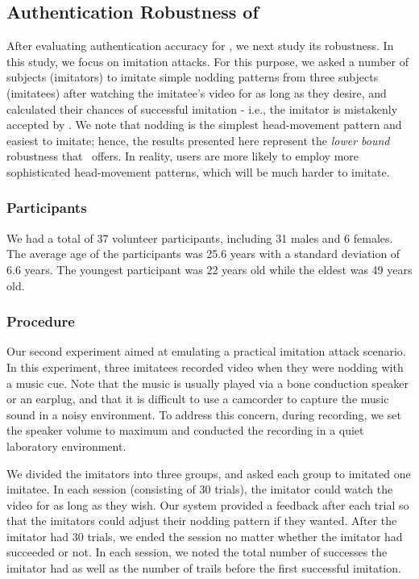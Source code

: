 
\subsection{Authentication Robustness of \systemname} After evaluating authentication accuracy for \systemname, we next study its robustness. In this study, we focus on imitation attacks. For this purpose, we asked a number of subjects (imitators) to imitate simple nodding patterns from three subjects (imitatees) after watching the imitatee's video for as long as they desire, and calculated their chances of successful imitation - i.e., the imitator is mistakenly accepted by \systemname. We note that nodding is the simplest head-movement pattern and easiest to imitate; hence, the results presented here represent the \emph{lower bound} robustness that \systemname~offers. In reality, users are more likely to employ more sophisticated head-movement patterns, which will be much harder to imitate.

\subsubsection{Participants}
We had a total of 37 volunteer participants, including 31 males and 6 females. The average age of the participants was 25.6 years with a standard deviation
of 6.6 years. The youngest participant was 22 years old while the eldest was 49 years old.

\subsubsection{Procedure}
Our second experiment aimed at emulating a practical imitation attack scenario. In this experiment, three imitatees recorded video when they were nodding with a music cue. Note that the music is usually played via a bone conduction speaker or an earplug, and that it is difficult to use a camcorder to capture the music sound in a noisy environment. To address this concern, during recording, we set the speaker volume to maximum and conducted the recording in a quiet laboratory environment.

We divided the imitators into three groups, and asked each group to imitated one imitatee. In each session (consisting of 30 trials), the imitator could watch the video for as long as they wish. Our system provided a feedback after each trial so that the imitators could adjust their nodding pattern if they wanted. After the imitator had 30 trials,
we ended the session no matter whether the imitator had succeeded or not. In each session, we noted the total number of successes the imitator had as well as the number of trails before the first successful imitation. %

